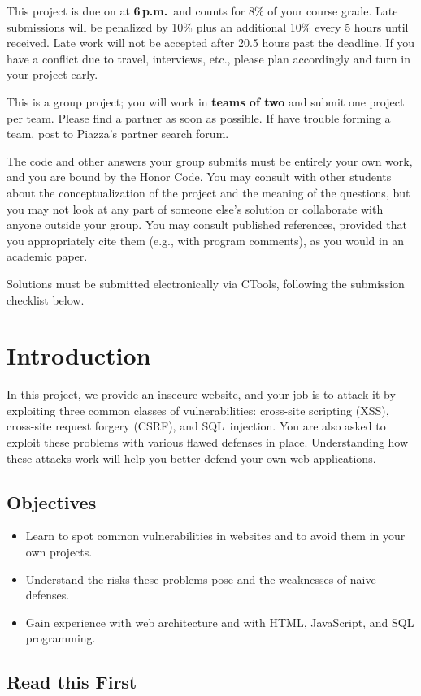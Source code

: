 \documentclass[letterpaper,12pt]{article}
\newcommand{\htitle}
{
     \noindent\parbox{\textwidth}
    {
        \course\hfill \distdate\newline
        \coursename\hfill 
        \settitle \vspace*{-.5ex}\newline
        \mbox{}\hrulefill\mbox{}
    }
    \vspace{8pt}
    \begin{center}{\Large\bf{\settitle}}\end{center}
}
\newcommand{\handout}
{
    \thispagestyle{empty}
    \markboth{}{}
    \pagestyle{plain}
    \htitle
}
\newcommand{\problemsetheader}
{
\setlength{\parindent}{0pt}

\medskip

This project is due on {\bf \duedate} at {\bf 6\,p.m.}\ and counts for 8\% of your course grade. Late submissions will be penalized by 10\% plus an additional 10\% every 5 hours until received.  Late work will not be accepted after 20.5 hours past the deadline.  If you have a conflict due to travel, interviews, etc., please plan accordingly and turn in your project early.

\medskip

This  is a group project; you will work in \textbf{teams of two} and submit one project per team.  Please find a partner as soon as possible.  If have trouble forming a team, post to Piazza's partner search forum.

\medskip

The code and other answers your group submits must be entirely your own work, and you are bound by the Honor Code.  You may consult with other students about the conceptualization of the project and the meaning of the questions, but you may not look at any part of someone else's solution or collaborate with anyone outside your group.  You may consult published references, provided that you appropriately cite them (e.g., with program comments), as you would in an academic paper.

\medskip

Solutions must be submitted electronically via CTools, following the submission checklist below.

\medskip

\hrulefill

\medskip
}
\begin{document}
\handout
\problemsetheader

\vspace*{-10pt}
\section*{Introduction}

In this project, we provide an insecure website, and your job is to attack it by exploiting three common classes of  vulnerabilities: cross-site scripting (XSS), cross-site request forgery (CSRF), and SQL~injection. You are also asked to exploit these problems with various flawed defenses in place.  Understanding how these attacks work will help you better defend your own web applications.

\subsection*{Objectives}
\begin{itemize}
\item Learn to spot common vulnerabilities in websites and to avoid them in your own projects.
\item Understand the risks these problems pose and the weaknesses of naive defenses.
\item Gain experience with web architecture and with HTML, JavaScript, and SQL programming.
\end{itemize}

\smallskip

\subsection*{Read this First}
\end{document}
